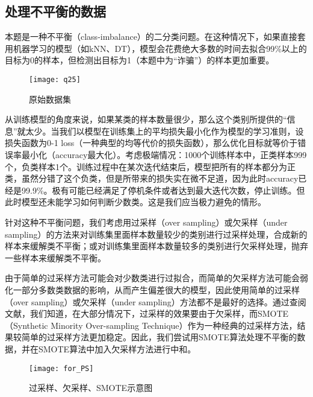\documentclass[a4paper,12pt]{article}
\begin{document}
\subsection{处理不平衡的数据}
本题是一种不平衡（class-imbalance）的二分类问题。在这种情况下，如果直接套用机器学习的模型（如kNN、DT），模型会花费绝大多数的时间去拟合99\%以上的目标为0的样本，但检测出目标为1（本题中为“诈骗”）的样本更加重要。

\begin{figure}[h]%
	\centering%
	\texttt{[image: q25]}
	\caption{原始数据集}
\end{figure}


从训练模型的角度来说，如果某类的样本数量很少，那么这个类别所提供的“信息”就太少。当我们以模型在训练集上的平均损失最小化作为模型的学习准则，设损失函数为0-1 loss（一种典型的均等代价的损失函数），那么优化目标就等价于错误率最小化（accuracy最大化）。考虑极端情况：1000个训练样本中，正类样本999个，负类样本1个。训练过程中在某次迭代结束后，模型把所有的样本都分为正类，虽然分错了这个负类，但是所带来的损失实在微不足道，因为此时accuracy已经是99.9\%。极有可能已经满足了停机条件或者达到最大迭代次数，停止训练。但此时模型还未能学习如何判断少数类。这是我们应当极力避免的情形。

针对这种不平衡问题，我们考虑用过采样（over sampling）或欠采样（under sampling）的方法来对训练集里面样本数量较少的类别进行过采样处理，合成新的样本来缓解类不平衡；或对训练集里面样本数量较多的类别进行欠采样处理，抛弃一些样本来缓解类不平衡。

由于简单的过采样方法可能会对少数类进行过拟合，而简单的欠采样方法可能会弱化一部分多数类数据的影响，从而产生偏差很大的模型，因此使用简单的过采样（over sampling）或欠采样（under sampling）方法都不是最好的选择。通过查阅文献，我们知道，在大部分情况下，过采样的效果要由于欠采样，而SMOTE（Synthetic Minority Over-sampling Technique）作为一种经典的过采样方法，结果较简单的过采样方法更加稳定。因此，我们尝试用SMOTE算法处理不平衡的数据，并在SMOTE算法中加入欠采样方法进行中和。


\begin{figure}[h]%
	\centering%
	\texttt{[image: for\_PS]}
	\caption{过采样、欠采样、SMOTE示意图}
\end{figure}
\end{document}
